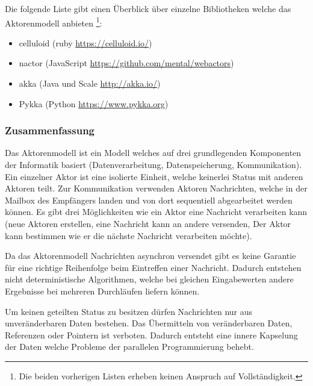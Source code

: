 Die folgende Liste gibt einen Überblick über einzelne Bibliotheken welche das Aktorenmodell anbieten \footnote{Die beiden vorherigen Listen erheben keinen Anspruch auf Vollständigkeit.}:

\begin{itemize}
  \item celluloid (ruby \url{https://celluloid.io/})
  \item nactor (JavaScript \url{https://github.com/mental/webactors})
  \item akka (Java und Scale \url{http://akka.io/})
  \item Pykka (Python \url{https://www.pykka.org})
\end{itemize}

\subsubsection{Zusammenfassung}
Das Aktorenmodell ist ein Modell welches auf drei grundlegenden Komponenten der Informatik basiert (Datenverarbeitung, Datenspeicherung, Kommunikation). Ein einzelner Aktor ist eine isolierte Einheit, welche keinerlei Status mit anderen Aktoren teilt. Zur Kommunikation verwenden Aktoren Nachrichten, welche in der Mailbox des Empfängers landen und von dort sequentiell abgearbeitet werden können. Es gibt drei Möglichkeiten wie ein Aktor eine Nachricht verarbeiten kann (neue Aktoren erstellen, eine Nachricht kann an andere versenden, Der Aktor kann bestimmen wie er die nächste Nachricht verarbeiten möchte).

Da das Aktorenmodell Nachrichten asynchron versendet gibt es keine Garantie für eine richtige Reihenfolge beim Eintreffen einer Nachricht. Dadurch entstehen nicht deterministische Algorithmen, welche bei gleichen Eingabewerten andere Ergebnisse bei mehreren Durchläufen liefern können. 

Um keinen geteilten Status zu besitzen dürfen Nachrichten nur aus unveränderbaren Daten bestehen. Das Übermitteln von veränderbaren Daten, Referenzen oder Pointern ist verboten. Dadurch entsteht eine innere Kapselung der Daten welche Probleme der parallelen Programmierung behebt.